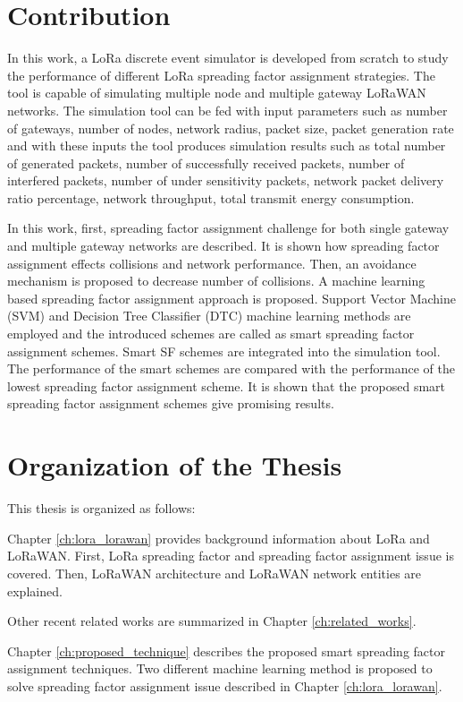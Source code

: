 \section{Contribution}
In this work, a LoRa discrete event simulator is developed from scratch to study the performance of different LoRa spreading factor assignment strategies. The tool is capable of simulating multiple node and multiple gateway LoRaWAN networks. The simulation tool can be fed with input parameters such as number of gateways, number of nodes, network radius, packet size, packet generation rate and with these inputs the tool produces simulation results such as total number of generated packets, number of successfully received packets, number of interfered packets, number of under sensitivity packets, network packet delivery ratio percentage, network throughput, total transmit energy consumption. 

In this work, first, spreading factor assignment challenge for both single gateway and multiple gateway networks are described. It is shown how spreading factor assignment effects collisions and network performance. Then, an avoidance mechanism is proposed to decrease number of collisions. A machine learning based spreading factor assignment approach is proposed. Support Vector Machine (SVM) and Decision Tree Classifier (DTC) machine learning methods are employed and the introduced schemes are called as smart spreading factor assignment schemes. Smart SF schemes are integrated into the simulation tool. The performance of the smart schemes are compared with the performance of the lowest spreading factor assignment scheme. It is shown that the proposed smart spreading factor assignment schemes give promising results.

\section{Organization of the Thesis}
This thesis is organized as follows:

Chapter \ref{ch:lora_lorawan} provides background information about LoRa and LoRaWAN. First, LoRa spreading factor and spreading factor assignment issue is covered. Then, LoRaWAN architecture and LoRaWAN network entities are explained.

Other recent related works are summarized in Chapter \ref{ch:related_works}.

Chapter \ref{ch:proposed_technique} describes the proposed smart spreading factor assignment techniques. Two different machine learning method is proposed to solve spreading factor assignment issue described in Chapter \ref{ch:lora_lorawan}.

